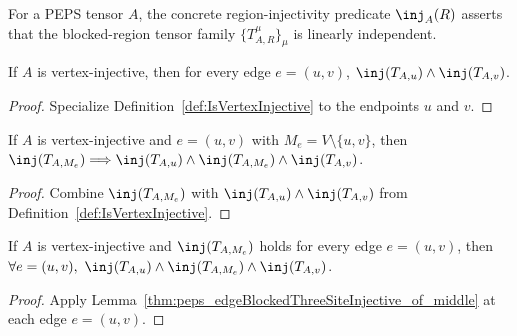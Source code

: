 \begin{definition}%
    \label{def:peps_regionInjectivityDataOf}
    \leanok
    For a PEPS tensor $A$, the concrete region-injectivity predicate $\inj_A(R)$
    asserts that the blocked-region tensor family $\{T_{A,R}^\mu\}_\mu$ is
    linearly independent.
\end{definition}

\begin{lemma}%
    \label{thm:peps_edgeBlockedEndpointTensorMaps_injective}
    \leanok
    If $A$ is vertex-injective, then for every edge $e=(u,v)$,
    $\inj(T_{A,u})\wedge\inj(T_{A,v})$.
\end{lemma}
\begin{proof}\leanok
    Specialize Definition~\ref{def:IsVertexInjective} to the endpoints $u$ and $v$.
\end{proof}

\begin{lemma}%
    \label{thm:peps_edgeBlockedThreeSiteInjective_of_middle}
    \leanok
    If $A$ is vertex-injective and $e=(u,v)$ with $M_e=V\setminus\{u,v\}$, then
    $\inj(T_{A,M_e})\Longrightarrow
        \inj(T_{A,u})\wedge\inj(T_{A,M_e})\wedge\inj(T_{A,v})$.
\end{lemma}
\begin{proof}\leanok
    Combine $\inj(T_{A,M_e})$ with $\inj(T_{A,u})\wedge\inj(T_{A,v})$ from
    Definition~\ref{def:IsVertexInjective}.
\end{proof}

\begin{lemma}%
    \label{thm:peps_edgeBlockedThreeSiteInjective_all_of_middle}
    \leanok
    If $A$ is vertex-injective and $\inj(T_{A,M_e})$ holds for every edge
    $e=(u,v)$, then
    $\forall e=(u,v),\ \inj(T_{A,u})\wedge\inj(T_{A,M_e})\wedge\inj(T_{A,v})$.
\end{lemma}
\begin{proof}\leanok
    Apply Lemma~\ref{thm:peps_edgeBlockedThreeSiteInjective_of_middle} at each
    edge $e=(u,v)$.
\end{proof}

